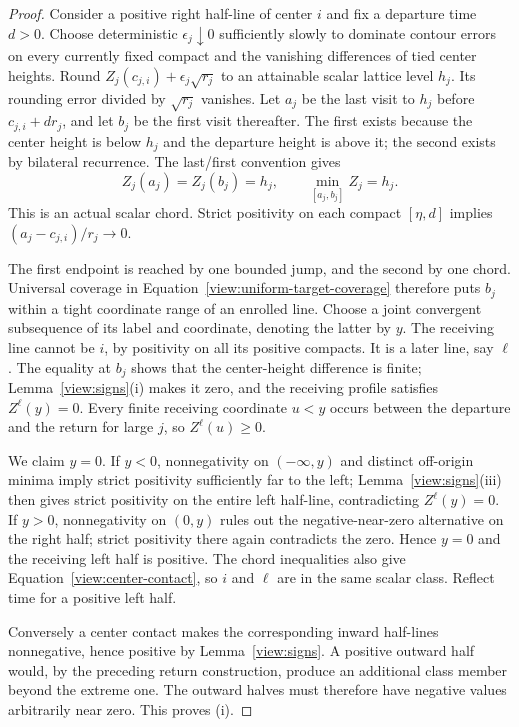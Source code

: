 \begin{proof}
Consider a positive right half-line of center $i$ and fix a departure
time $d>0$.  Choose deterministic $\epsilon_j\downarrow0$ sufficiently
slowly to dominate contour errors on every currently fixed compact and
the vanishing differences of tied center heights.  Round
$Z_j(c_{j,i})+\epsilon_j\sqrt{r_j}$ to an attainable scalar lattice level
$h_j$.  Its rounding error divided by $\sqrt{r_j}$ vanishes.  Let $a_j$
be the last visit to $h_j$ before $c_{j,i}+dr_j$, and let $b_j$ be the first
visit thereafter.  The first exists because the center height is below
$h_j$ and the departure height is above it; the second exists by bilateral
recurrence.  The last/first convention gives
\[
 Z_j(a_j)=Z_j(b_j)=h_j,
 \qquad \min_{[a_j,b_j]}Z_j=h_j.
\]
This is an actual scalar chord.  Strict positivity on each compact
$[\eta,d]$ implies $(a_j-c_{j,i})/r_j\to0$.

The first endpoint is reached by one bounded jump, and the second by
one chord.  Universal coverage in
Equation~\eqref{view:uniform-target-coverage} therefore puts $b_j$ within
a tight coordinate range of an enrolled line.  Choose a joint convergent
subsequence of its label and coordinate, denoting the latter by $y$.
The receiving line cannot be $i$, by positivity on all its positive
compacts.  It is a later line, say $\ell$.  The equality at $b_j$ shows
that the center-height difference is finite; Lemma~\ref{view:signs}(i)
makes it zero, and the receiving profile satisfies $Z^\ell(y)=0$.
Every finite receiving coordinate $u<y$ occurs between the departure and
the return for large $j$, so $Z^\ell(u)\ge0$.

We claim $y=0$.  If $y<0$, nonnegativity on $(-\infty,y)$ and distinct
off-origin minima imply strict positivity sufficiently far to the left;
Lemma~\ref{view:signs}(iii) then gives strict positivity on the entire
left half-line, contradicting $Z^\ell(y)=0$.  If $y>0$, nonnegativity on
$(0,y)$ rules out the negative-near-zero alternative on the right half;
strict positivity there again contradicts the zero.  Hence $y=0$ and the
receiving left half is positive.  The chord inequalities also give
Equation~\eqref{view:center-contact}, so $i$ and $\ell$ are in the same
scalar class.  Reflect time for a positive left half.

Conversely a center contact makes the corresponding inward half-lines
nonnegative, hence positive by Lemma~\ref{view:signs}.  A positive outward
half would, by the preceding return construction, produce an additional
class member beyond the extreme one.  The outward halves must therefore
have negative values arbitrarily near zero.  This proves (i).


\end{proof}

